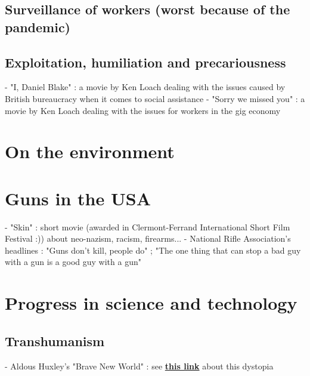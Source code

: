 \documentclass[10pt]{article}
\newcommand\unlien[2]{{\color{color1}\href{#1}{\textbf{#2}}}}
\begin{document}
\subsection*{Surveillance of workers (worst because of the pandemic)}



\subsection*{Exploitation, humiliation and precariousness}
- "I, Daniel Blake" : a movie by Ken Loach dealing with the issues caused by British bureaucracy when it comes to social assistance
- "Sorry we missed you" : a movie by Ken Loach dealing with the issues for workers in the gig economy



\section*{On the environment}


\section*{Guns in the USA}
- "Skin" : short movie (awarded in Clermont-Ferrand International Short Film Festival :)) about neo-nazism, racism, firearms... 
- National Rifle Association's headlines : "Guns don't kill, people do" ; "The one thing that can stop a bad guy with a gun is a good guy with a gun"

\section*{Progress in science and technology}
\subsection*{Transhumanism}
- Aldous Huxley's "Brave New World" : see \unlien{https://fr.wikipedia.org/wiki/Le_Meilleur_des_mondes}{this link} about this dystopia
\end{document}
